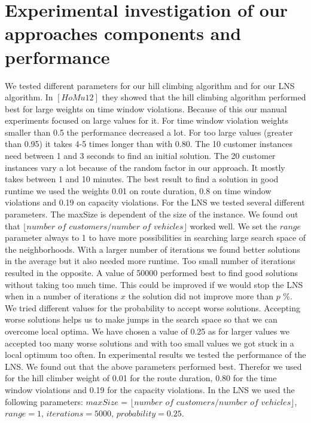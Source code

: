 \documentclass[fleqn]{scrartcl}
\begin{document}
\newpage
\section{Experimental investigation of our approaches components and performance}
We tested different parameters for our hill climbing algorithm and for our LNS algorithm. In $[HoMu 12]$ they showed that the hill climbing algorithm performed best for large weights on time window violations. Because of this our manual experiments focused on large values for it. For time window violation weights smaller than 0.5 the performance decreased a lot. For too large values (greater than 0.95) it takes 4-5 times longer than with 0.80. The 10 customer instances need between 1 and 3 seconds to find an initial solution. The 20 customer instances vary a lot because of the random factor in our approach. It mostly takes between 1 and 10 minutes. The best result to find a solution in good runtime we used the weights 0.01 on route duration, 0.8 on time window violations and 0.19 on capacity violations.
For the LNS we tested several different parameters. The maxSize is dependent of the size of the instance. We found out that $\lfloor$$number$ $of$ $customers / number$ $of$ $vehicles$$\rfloor$ worked well. We set the $range$ parameter always to 1 to have more possibilities in searching large search space of the neighborhoods. With a larger number of iterations we found better solutions in the average but it also needed more runtime. Too small number of iterations resulted in the opposite. A value of 50000 performed best to find good solutions without taking too much time. This could be improved if we would stop the LNS when in a number of iterations $x$ the solution did not improve more than $p$ \%. \\
We tried different values for the probability to accept worse solutions. Accepting worse solutions helps us to make jumps in the search space so that we can overcome local optima. We have chosen a value of 0.25 as for larger values we accepted too many worse solutions and with too small values we got stuck in a local optimum too often.
In experimental results we tested the performance of the LNS. We found out that the above parameters performed best. Therefor we used for the hill climber weight of 0.01 for the route duration, 0.80 for the time window violations and 0.19 for the capacity violations. In the LNS we used the following parameters: $maxSize$ = $\lfloor$$number$ $of$ $customers/number$ $of$ $vehicles$$\rfloor$, $range = 1$, $iterations = 5000$, $probability = 0.25$.\\
\end{document}

